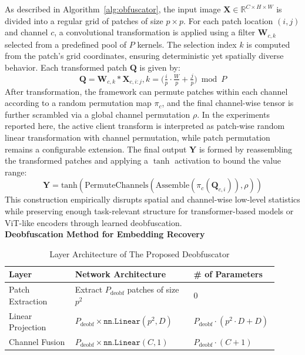 \documentclass{ieeeaccess}
\newcommand{\rev}[1]{{\color{green}#1}}
\begin{document}
As described in Algorithm~\ref{alg:obfuscator}, the input image $\mathbf{X} \in \mathbb{R}^{C \times H \times W}$ is divided into a regular grid of patches of size $p \times p$. For each patch location $(i,j)$ and channel $c$, a convolutional transformation is applied using a filter $\mathbf{W}_{c,k}$ selected from a predefined pool of $P$ kernels. The selection index $k$ is computed from the patch's grid coordinates, ensuring deterministic yet spatially diverse behavior. Each transformed patch $\mathbf{Q}$ is given by:
\begin{equation}
    \mathbf{Q} = \mathbf{W}_{c,k}\ast\mathbf{X}_{c,i:j},k = \bigl(\tfrac{i}{p}\cdot\tfrac{W}{p}+\tfrac{j}{p}\bigr)\bmod P
\end{equation}
\rev{After transformation, the framework can permute patches within each channel according to a random permutation map $\pi_c$, and the final channel-wise tensor is further scrambled via a global channel permutation $\rho$. In the experiments reported here, the active client transform is interpreted as patch-wise random linear transformation with channel permutation, while patch permutation remains a configurable extension. The final output $\mathbf{Y}$ is formed by reassembling the transformed patches and applying a $\tanh$ activation to bound the value range:}
\begin{equation}
    \mathbf{Y} = \text{tanh}(\text{PermuteChannels}(\text{Assemble}(\pi_c(\mathbf{Q}_{c,i})), \rho))
\end{equation}
\rev{This construction empirically disrupts spatial and channel-wise low-level statistics while preserving enough task-relevant structure for transformer-based models or ViT-like encoders through learned deobfuscation.} \\

\noindent\textbf{Deobfuscation Method for Embedding Recovery}

\begin{table}[t]
\centering
\caption{Layer Architecture of The Proposed Deobfuscator}
\label{tab:deobf-symbolic}
\begin{tabular}{p{0.24\linewidth} p{0.43\linewidth} p{0.24\linewidth}}
\toprule
\textbf{Layer} & \textbf{Network Architecture} & \textbf{\# of Parameters} \\
\midrule
Patch Extraction &
Extract $P_{\text{deobf}}$ patches of size $p^2$ &
$0$ \\

Linear Projection &
$P_{\text{deobf}} \times \texttt{nn.Linear}(p^2, D)$ &
$P_{\text{deobf}} \cdot (p^2 \cdot D + D)$ \\

Channel Fusion &
$P_{\text{deobf}} \times \texttt{nn.Linear}(C, 1)$ &
$P_{\text{deobf}} \cdot (C + 1)$ \\
\bottomrule
\end{tabular}
\end{table}
\end{document}
